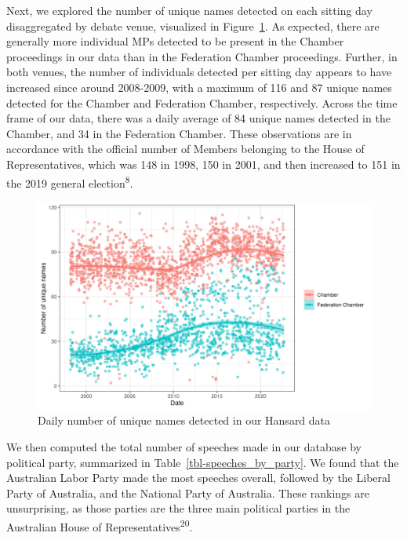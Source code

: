 \documentclass[
  letterpaper,
  DIV=11,
  numbers=noendperiod]{scrartcl}
\begin{document}
Next, we explored the number of unique names detected on each sitting
day disaggregated by debate venue, visualized in Figure~\ref{fig-names}.
As expected, there are generally more individual MPs detected to be
present in the Chamber proceedings in our data than in the Federation
Chamber proceedings. Further, in both venues, the number of individuals
detected per sitting day appears to have increased since around
2008-2009, with a maximum of 116 and 87 unique names detected for the
Chamber and Federation Chamber, respectively. Across the time frame of
our data, there was a daily average of 84 unique names detected in the
Chamber, and 34 in the Federation Chamber. These observations are in
accordance with the official number of Members belonging to the House of
Representatives, which was 148 in 1998, 150 in 2001, and then increased
to 151 in the 2019 general election\textsuperscript{8}.

\begin{figure}

{\centering \includegraphics[width=4.58333in,height=\textheight]{n_unique_names.jpg}

}

\caption{\label{fig-names}Daily number of unique names detected in our
Hansard data}

\end{figure}

We then computed the total number of speeches made in our database by
political party, summarized in Table~\ref{tbl-speeches_by_party}. We
found that the Australian Labor Party made the most speeches overall,
followed by the Liberal Party of Australia, and the National Party of
Australia. These rankings are unsurprising, as those parties are the
three main political parties in the Australian House of
Representatives\textsuperscript{20}.
\end{document}
